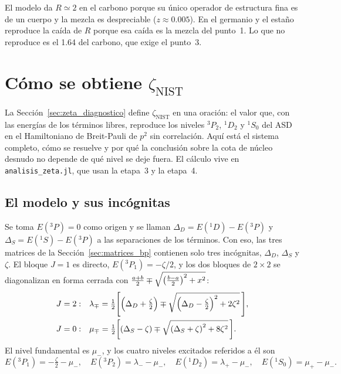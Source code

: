 \documentclass[11pt,a4paper]{article}
\begin{document}
\begin{table}[htbp]
  \centering
  
  \caption{La Tabla~\ref{tab:acoplamiento} de la tesis: escalas del régimen de acoplamiento
  (cm$^{-1}$) y razón de intervalos del modelo y del NIST.}
\end{table}

El modelo da $R \simeq 2$ en el carbono porque su único operador de estructura fina es de un cuerpo
y la mezcla es despreciable ($z \approx 0.005$). En el germanio y el estaño reproduce la caída de
$R$ porque esa caída es la mezcla del punto~1. Lo que no reproduce es el 1.64 del carbono, que
exige el punto~3.

\section{Cómo se obtiene \texorpdfstring{$\zeta_{\text{NIST}}$}{zeta NIST}}
\label{det:zeta_nist}

La Sección~\ref{sec:zeta_diagnostico} define $\zeta_{\text{NIST}}$ en una oración: el valor que,
con las energías de los términos libres, reproduce los niveles $^3P_2$, $^1D_2$ y $^1S_0$ del ASD
en el Hamiltoniano de Breit-Pauli de $p^2$ sin correlación. Aquí está el sistema completo, cómo se
resuelve y por qué la conclusión sobre la cota de núcleo desnudo no depende de qué nivel se deje
fuera. El cálculo vive en \texttt{analisis\_zeta.jl}, que usan la etapa~3 y la etapa~4.

\subsection{El modelo y sus incógnitas}

Se toma $E(^3P) = 0$ como origen y se llaman $\Delta_D = E(^1D) - E(^3P)$ y
$\Delta_S = E(^1S) - E(^3P)$ a las separaciones de los términos. Con eso, las tres matrices de la
Sección~\ref{sec:matrices_bp} contienen solo tres incógnitas, $\Delta_D$, $\Delta_S$ y $\zeta$. El
bloque $J=1$ es directo, $E(^3P_1) = -\zeta/2$, y los dos bloques de $2\times2$ se diagonalizan en
forma cerrada con $\tfrac{a+b}{2} \mp \sqrt{\qty(\tfrac{b-a}{2})^2 + x^2}$:
\begin{align}
  J=2:&\quad \lambda_\mp = \tfrac{1}{2}\qty[\qty(\Delta_D + \tfrac{\zeta}{2})
        \mp \sqrt{\qty(\Delta_D - \tfrac{\zeta}{2})^2 + 2\zeta^2}\,], \\
  J=0:&\quad \mu_\mp = \tfrac{1}{2}\qty[\qty(\Delta_S - \zeta)
        \mp \sqrt{\qty(\Delta_S + \zeta)^2 + 8\zeta^2}\,].
\end{align}
El nivel fundamental es $\mu_-$, y los cuatro niveles excitados referidos a él son
\begin{equation}
  E(^3P_1) = -\tfrac{\zeta}{2} - \mu_-, \quad
  E(^3P_2) = \lambda_- - \mu_-, \quad
  E(^1D_2) = \lambda_+ - \mu_-, \quad
  E(^1S_0) = \mu_+ - \mu_- .
  \label{det:niveles_nist}
\end{equation}
\end{document}
